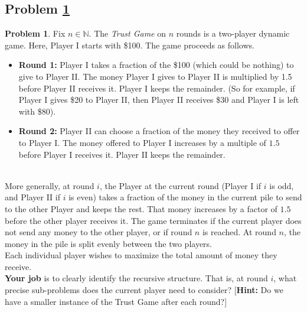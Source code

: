 \documentclass[11pt]{article}
\theoremstyle{definition}
\theoremstyle{definition}
\newtheorem{required}{Problem}
\theoremstyle{definition}
\begin{document}
\newpage
\subsection{Problem \ref{DP2}}
\begin{required} \label{DP2}
Fix $n \in \mathbb{N}$. The \textit{Trust Game} on $n$ rounds is a two-player dynamic game. Here, Player I starts with \$100. The game proceeds as follows.
\begin{itemize}
\item \textbf{Round 1:} Player I takes a fraction of the \$100 (which could be nothing) to give to Player II. The money Player I gives to Player II is multiplied by 1.5 before Player II receives it. Player I keeps the remainder. (So for example, if Player I gives \$20 to Player II, then Player II receives \$30 and Player I is left with \$80).

\item \textbf{Round 2:} Player II can choose a fraction of the money they received to offer to Player I. The money offered to Player I increases by a multiple of $1.5$  before Player I receives it. Player II keeps the remainder.
\end{itemize}

\noindent \\ More generally, at round $i$, the Player at the current round (Player I if $i$ is odd, and Player II if $i$ is even) takes a fraction of the money in the current pile to send to the other Player and keeps the rest. That money increases by a factor of $1.5$ before the other player receives it. The game terminates if the current player does not send any money to the other player, or if round $n$ is reached. At round $n$, the money in the pile is split evenly between the two players. \\

\noindent Each individual player wishes to maximize the total amount of money they receive. \\

\noindent \textbf{Your job} is to clearly identify the recursive structure. That is, at round $i$, what precise sub-problems does the current player need to consider? [\textbf{Hint:} Do we have a smaller instance of the Trust Game after each round?]
\end{required}
\end{document}
